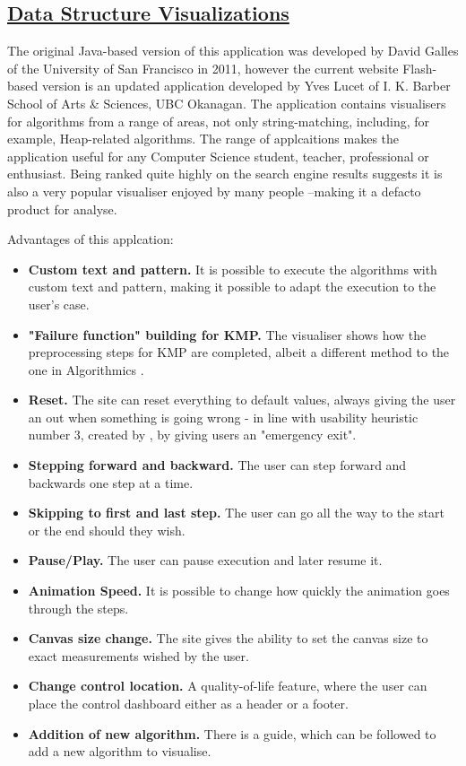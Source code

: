 \subsection{\href{https://cmps-people.ok.ubc.ca/ylucet/DS/Algorithms.html}{Data Structure Visualizations}}

The original Java-based version of this application was developed by David Galles of the University of San Francisco in 2011, however the current website Flash-based version is an updated application developed by Yves Lucet of I. K. Barber School of Arts \& Sciences, UBC Okanagan. The application contains visualisers for algorithms from a range of areas, not only string-matching, including, for example, Heap-related algorithms. The range of applcaitions makes the application useful for any Computer Science student, teacher, professional or enthusiast.  Being ranked quite highly on the search engine results suggests it is also a very popular visualiser enjoyed by many people --making it a defacto product for analyse.

Advantages of this applcation:
\begin{itemize}
    \item \textbf{Custom text and pattern.} It is possible to execute the algorithms with custom text and pattern, making it possible to adapt the execution to the user's case.
    \item \textbf{"Failure function" building for KMP.}  The visualiser shows how the preprocessing steps for KMP are completed, albeit a different method to the one in Algorithmics .
    \item \textbf{Reset.} The site can reset everything to default values, always giving the user an out when something is going wrong - in line with usability heuristic number 3, created by \cite{Nielsen_2024}, by giving users an "emergency exit".
    \item \textbf{Stepping forward and backward.} The user can step forward and backwards one step at a time.
    \item \textbf{Skipping to first and last step.} The user can go all the way to the start or the end should they wish.
    \item \textbf{Pause/Play.} The user can pause execution and later resume it.
    \item \textbf{Animation Speed.} It is possible to change how quickly the animation goes through the steps.
    \item \textbf{Canvas size change.}  The site gives the ability to set the canvas size to exact measurements wished by the user.
    \item \textbf{Change control location.} A quality-of-life feature, where the user can place the control dashboard either as a header or a footer.
    \item \textbf{Addition of new algorithm.} There is a guide, which can be followed to add a new algorithm to visualise.
\end{itemize}


